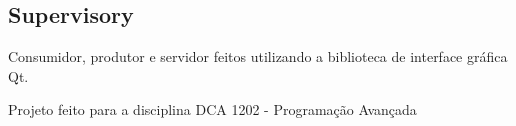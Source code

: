 \subsection*{Supervisory}

Consumidor, produtor e servidor feitos utilizando a biblioteca de interface gráfica Qt.

Projeto feito para a disciplina D\+CA 1202 -\/ Programação Avançada 